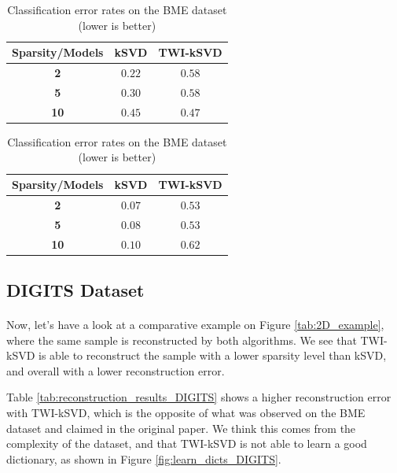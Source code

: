 \documentclass[11pt]{article}
\begin{document}
\begin{table}[!ht]
    \begin{minipage}{.55\linewidth}
      \centering
        \begin{tabular}{ccc}
            \toprule
            \textbf{Sparsity/Models} & \textbf{kSVD} & \textbf{TWI-kSVD} \\
            \midrule
            \textbf{2} & $\bm{0.22}$ & $0.58$ \\
            \textbf{5} & $0.30$ & $0.58$ \\
            \textbf{10} & $0.45$ & $\bm{0.47}$ \\
            \bottomrule
        \end{tabular}
        \caption*{Original classification strategy}
    \end{minipage}
    \begin{minipage}{.35\linewidth}
      \centering
        \begin{tabular}{ccc}
            \toprule
            \textbf{Sparsity/Models} & \textbf{kSVD} & \textbf{TWI-kSVD} \\
            \midrule
            \textbf{2} & $\bm{0.07}$ & $\bm{0.53}$ \\
            \textbf{5} & $0.08$ & $\bm{0.53}$ \\
            \textbf{10} & $0.10$ & $0.62$ \\
            \bottomrule
        \end{tabular}
        \caption*{Our classification strategy}
    \end{minipage} 
    \caption{Classification error rates on the BME dataset (lower is better)}
    \label{tab:classif_results_BME}
\end{table}

\subsection{DIGITS Dataset}

\paragraph{} Now, let's have a look at a comparative example on Figure \ref{tab:2D_example}, where the same sample is reconstructed by both algorithms. We see that TWI-kSVD is able to reconstruct the sample with a lower sparsity level than kSVD, and overall with a lower reconstruction error.

Table \ref{tab:reconstruction_results_DIGITS} shows a higher reconstruction error with TWI-kSVD, which is the opposite of what was observed on the BME dataset and claimed in the original paper. We think this comes from the complexity of the dataset, and that TWI-kSVD is not able to learn a good dictionary, as shown in Figure \ref{fig:learn_dicts_DIGITS}.
\end{document}
